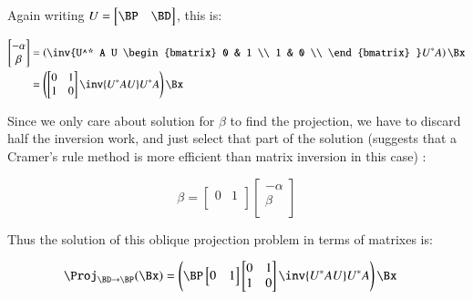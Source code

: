 \documentclass{article}      %
\begin{document}
Again writing $U = 
\begin{bmatrix}
\BP & \BD \\
\end{bmatrix}
$, this is:

\begin{align*}
\begin{bmatrix}
-\alpha \\
\beta \\
\end{bmatrix}
&=
\left(
\inv{U^* A U 
\begin{bmatrix}
0 & 1 \\
1 & 0 \\
\end{bmatrix}
}
U^*
A
\right)
\Bx \\
&=
\left(
\begin{bmatrix}
0 & 1 \\
1 & 0 \\
\end{bmatrix}
\inv{U^* A U 
}
U^*
A
\right)
\Bx \\
\end{align*}

Since we only care about solution for $\beta$ to find the projection, we have to discard half the inversion work, and just select
that part of the solution (suggests that a Cramer's rule method is more efficient than matrix inversion in this case) :

\[
\beta = 
\begin{bmatrix}
0 & 1 \\
\end{bmatrix}
\begin{bmatrix}
-\alpha \\
\beta \\
\end{bmatrix}
\]

Thus the solution of this oblique projection problem in terms of matrixes is:

\begin{align*}
\Proj_{\BD \rightarrow \BP}(\Bx) 
&= 
\left(
\BP
\begin{bmatrix}
0 & 1 \\
\end{bmatrix}
\begin{bmatrix}
0 & 1 \\
1 & 0 \\
\end{bmatrix}
\inv{U^* A U 
}
U^*
A
\right)
\Bx
\end{align*}
\end{document}
